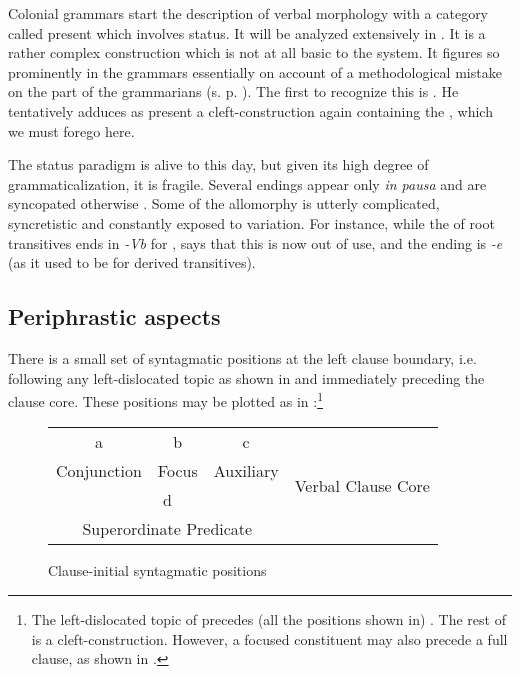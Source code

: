 \documentclass[output=paper]{langsci/langscibook}
\begin{document}
Colonial grammars start the description of verbal morphology with a category called present which involves  status. It will be analyzed extensively in . It is a rather complex  construction which is not at all basic to the system. It figures so prominently in the grammars essentially on account of a methodological mistake on the part of the grammarians (s. p. \pageref{lehmann:methomistake}). The first to recognize this is \citet[§§60, 172]{Beltrán1746}. He tentatively adduces as present a cleft-construction again containing the  , which we must forego here.

The status paradigm is alive to this day, but given its high degree of grammaticalization, it is fragile. Several endings appear only \textit{in pausa} and are syncopated otherwise \citep[§§135--147]{Beltrán1746}. Some of the allomorphy is utterly complicated, syncretistic and constantly exposed to variation. For instance, while the  of root transitives ends in \textit{{}-Vb} for \citet{SanBuenaventura1684}, \citet[§112]{Beltrán1746} says that this is now out of use, and the ending is \textit{{}-e} (as it used to be for derived transitives).

\subsection{Periphrastic aspects}\label{sec:lehmann:4.5}
There is a small set of syntagmatic positions at the left clause boundary, i.e. following any left-dislocated topic as shown in  and immediately preceding the clause core. These positions may be plotted as in :\footnote{The left-dislocated topic of  precedes (all the positions shown in) . The rest of  is a cleft-construction. However, a focused constituent may also precede a full clause, as shown in .}\largerpage[2] 

\begin{figure}
\caption{Clause-initial syntagmatic positions}\label{dig:lehmann:7}
\begin{tabular}{cccc}
\midrule
 a & b & c & \multirow{4}{3cm}{Verbal Clause Core}\\
 Conjunction & Focus & Auxiliary & \\
\cmidrule{1-3}
\multicolumn{3}{c}{d} & \\
\multicolumn{3}{c}{Superordinate Predicate} & \\
\midrule 
\end{tabular}
\end{figure}
\end{document}

